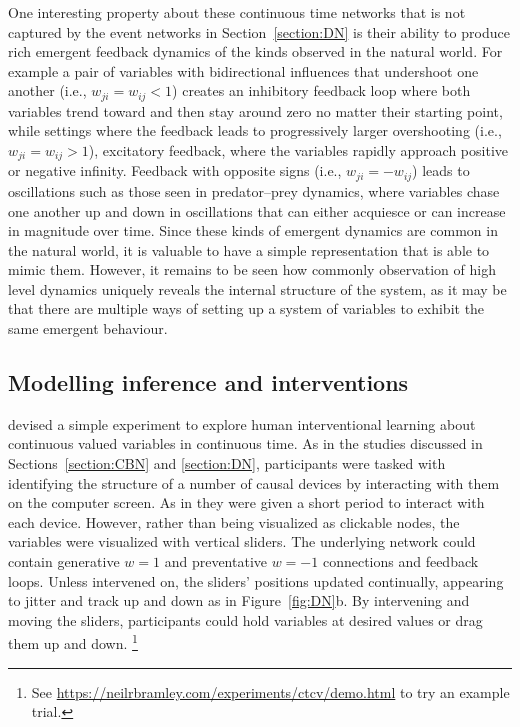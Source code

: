\documentclass{cambridge7A}%
\begin{document}
One interesting property about these continuous time networks that is not captured by the event networks in Section~\ref{section:DN} is their ability to produce rich emergent feedback dynamics of the kinds observed in the natural world.  
For example a pair of variables with bidirectional influences that undershoot one another (i.e., $w_{ji}=w_{ij}<1$) creates an inhibitory feedback loop where both variables trend toward and then stay around zero no matter their starting point, while settings where the feedback leads to progressively larger overshooting (i.e., $w_{ji}=w_{ij}>1$), excitatory feedback, where the variables rapidly approach positive or negative infinity.  
Feedback with opposite signs (i.e., $w_{ji} = -w_{ij}$) leads to oscillations such as those seen in predator--prey dynamics, where variables chase one another up and down in oscillations that can either acquiesce or can increase in magnitude over time.  Since these kinds of emergent dynamics are common in the natural world, it is valuable to have a simple representation that is able to mimic them.  However, it remains to be seen how commonly observation of high level dynamics uniquely reveals the internal structure of the system, as it may be that there are multiple ways of setting up a system of variables to exhibit the same emergent behaviour.


\subsection{Modelling inference and interventions}

\cite{davis2018ctcv} devised a simple experiment to explore human interventional learning about continuous valued variables in continuous time.  As in the studies discussed in Sections~\ref{section:CBN} and \ref{section:DN}, participants were tasked with identifying the structure of a number of causal devices by interacting with them on the computer screen.  As in \cite{bramley2017dynamic} they were given a short period to interact with each device.  However, rather than being visualized as clickable nodes, the variables were visualized with vertical sliders.  The underlying network could contain generative $w=1$ and preventative $w=-1$ connections and feedback loops.  Unless intervened on, the sliders' positions updated continually, 
appearing to jitter and track up and down as in Figure~\ref{fig:DN}b. By intervening and moving the sliders, participants could hold variables at desired values or drag them up and down.
\footnote{See \url{https://neilrbramley.com/experiments/ctcv/demo.html} to try an example trial.}
\end{document}
